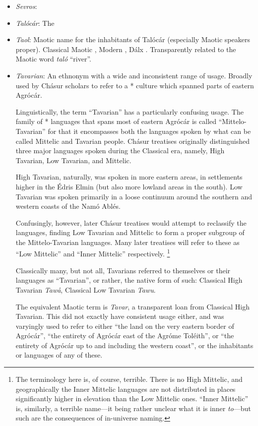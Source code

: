 \documentclass{article}
\let\oldthefootnote\thefootnote
\newcommand\oocfootnote[2][DarkGreen]{\renewcommand\thefootnote{\color{#1}\oldthefootnote}%
  \footnote{\color{#1}#2}%
  \renewcommand{\thefootnote}{\oldthefootnote}}
\begin{document}
\begin{itemize}
 \item \textit{Sevros}:

 \item \textit{Talócár}: The

 \item \textit{Taol}: Maotic name for the inhabitants of Talócár (especially Maotic speakers proper). Classical Maotic , Modern , Dálx . Transparently related to the Maotic word \textit{taló} ``river''.

 \item \textit{Tavarian}: An ethnonym with a wide and inconsistent range of usage. Broadly used by Chásur scholars to refer to a * culture which spanned parts of eastern Agrócár.

 Linguistically, the term ``Tavarian'' has a particularly confusing usage. The family of * languages that spans most of eastern Agrócár is called ``Mittelo-Tavarian'' for that it encompasses both the languages spoken by what can be called Mittelic and Tavarian people. Chásur treatises originally distinguished three major languages spoken during the Classical era, namely, High Tavarian, Low Tavarian, and Mittelic.

 High Tavarian, naturally, was spoken in more eastern areas, in settlements higher in the Édris Elmin (but also more lowland areas in the south). Low Tavarian was spoken primarily in a loose continuum around the southern and western coasts of the Namó Ablés.

 Confusingly, however, later Chásur treatises would attempt to reclassify the languages, finding Low Tavarian and Mittelic to form a proper subgroup of the Mittelo-Tavarian languages. Many later treatises will refer to these as ``Low Mittelic'' and ``Inner Mittelic'' respectively.\oocfootnote{The terminology here is, of course, terrible. There is no High Mittelic, and geographically the Inner Mittelic languages are not distributed in places significantly higher in elevation than the Low Mittelic ones. ``Inner Mittelic'' is, similarly, a terrible name—it being rather unclear what it is inner \emph{to}—but such are the consequences of in-universe naming.}

 Classically many, but not all, Tavarians referred to themselves or their languages as ``Tavarian'', or rather, the native form of such: Classical High Tavarian \textit{Tawå}, Classical Low Tavarian \textit{Tawu}.

 The equivalent Maotic term is \textit{Tavar}, a transparent loan from Classical High Tavarian. This did not exactly have consistent usage either, and was varyingly used to refer to either ``the land on the very eastern border of Agrócár'', ``the entirety of Agrócár east of the Agróme Toléith'', or ``the entirety of Agrócár up to and including the western coast'', or the inhabitants or languages of any of these.


\end{itemize}
\end{document}
